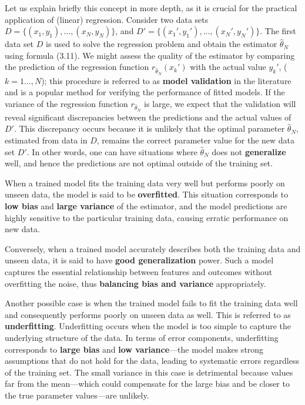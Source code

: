 \documentclass{report}
\begin{document}
Let us explain briefly this concept in more depth, as it is crucial for the practical application of (linear) regression. Consider two data sets $D = \{(x_1,y_1),\dots,(x_N,y_N)\}$, and $D' = \{(x_1',y_1'),\dots,(x_N',y_N')\}$. The first data set $D$ is used to solve the regression problem and obtain the estimator $\hat{\theta}_N$ using formula (3.11). We might assess the quality of the estimator by comparing the prediction of the regression function $r_{\hat{\theta}_N}(x_k')$ with the actual value $y_k'$, ($k = 1\dots,N$); this procedure is referred to as \textbf{model validation} in the literature and is a popular method for verifying the performance of fitted models. If the variance of the regression function $r_{\hat{\theta}_N}$ is large, we expect that the validation will reveal significant discrepancies between the predictions and the actual values of $D'$. This discrepancy occurs because it is unlikely that the optimal parameter $\hat{\theta}_N$, estimated from data in $D$, remains the correct parameter value for the new data set $D'$. In other words, one can have situations where $\hat{\theta}_N$ does not \textbf{generalize} well, and hence the predictions are not optimal outside of the training set.

When a trained model fits the training data very well but performs poorly on unseen data, the model is said to be \textbf{overfitted}. This situation corresponds to \textbf{low bias} and \textbf{large variance} of the estimator, and the model predictions are highly sensitive to the particular training data, causing erratic performance on new data.

Conversely, when a trained model accurately describes both the training data and unseen data, it is said to have \textbf{good generalization} power. Such a model captures the essential relationship between features and outcomes without overfitting the noise, thus \textbf{balancing bias and variance} appropriately.

Another possible case is when the trained model fails to fit the training data well and consequently performs poorly on unseen data as well. This is referred to as \textbf{underfitting}. Underfitting occurs when the model is too simple to capture the underlying structure of the data. In terms of error components, underfitting corresponds to \textbf{large bias} and \textbf{low variance}—the model makes strong assumptions that do not hold for the data, leading to systematic errors regardless of the training set. The small variance in this case is detrimental because values far from the mean—which could compensate for the large bias and be closer to the true parameter values—are unlikely.
\end{document}
